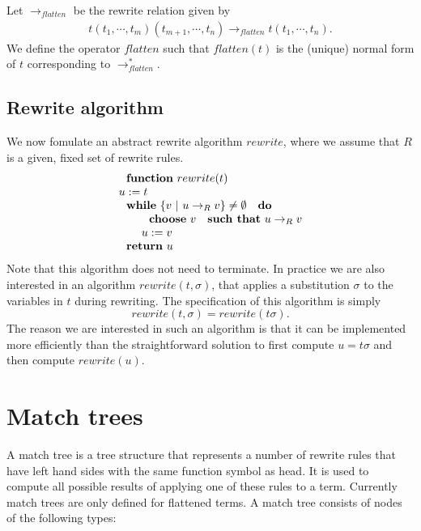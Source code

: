 \documentclass{article}
\begin{document}
Let $\rightarrow _{flatten}$ be the rewrite relation given by%
\begin{equation*}
\begin{array}{c}
t(t_{1},\cdots ,t_{m})(t_{m+1},\cdots ,t_{n})\rightarrow
_{flatten}t(t_{1},\cdots ,t_{n}).%
\end{array}%
\end{equation*}%
We define the operator $flatten$ such that $flatten(t)$ is the (unique)
normal form of $t$ corresponding to $\rightarrow _{flatten}^{\ast }$.

\subsection{Rewrite algorithm}

We now fomulate an abstract rewrite algorithm $rewrite$, where we assume
that $R$ is a given, fixed set of rewrite rules.%
\begin{equation*}
\begin{array}{l}
\text{\textbf{function} }rewrite(t) \\ 
u:=t \\ 
\text{\textbf{while} }\{v\ |\ u\rightarrow _{R}v\}\neq \emptyset \text{ 
\textbf{do}} \\ 
\qquad \text{\textbf{choose} }v\text{ \textbf{such that} }u\rightarrow _{R}v
\\ 
\qquad u:=v \\ 
\text{\textbf{return} }u%
\end{array}%
\end{equation*}%
Note that this algorithm does not need to terminate. In practice we are also
interested in an algorithm $rewrite(t,\sigma )$, that applies a substitution 
$\sigma $ to the variables in $t$ during rewriting. The specification of
this algorithm is simply%
\begin{equation*}
rewrite(t,\sigma )=rewrite(t\sigma ).
\end{equation*}%
The reason we are interested in such an algorithm is that it can be
implemented more efficiently than the straightforward solution to first
compute $u=t\sigma $ and then compute $rewrite(u)$.

\section{Match trees}

A match tree is a tree structure that represents a number of rewrite rules
that have left hand sides with the same function symbol as head. It is used
to compute all possible results of applying one of these rules to a term.
Currently match trees are only defined for flattened terms. A match tree
consists of nodes of the following types:
\end{document}
